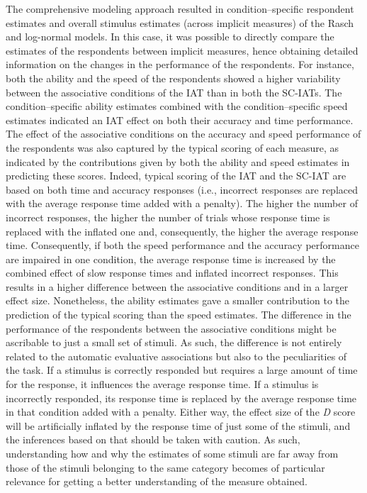 \documentclass[12pt]{book}
\begin{document}
The comprehensive modeling approach resulted in condition--specific respondent estimates and overall stimulus estimates (across implicit measures) of the Rasch and log-normal models. In this case, it was possible to directly compare the estimates of the respondents between implicit measures, hence obtaining detailed information on the changes in the performance of the respondents. For instance, both the ability and the speed of the respondents showed a higher variability between the associative conditions of the IAT than in both the SC-IATs. 
The condition--specific ability estimates combined with the condition--specific speed estimates indicated an IAT effect on both their accuracy and time performance. The effect of the associative conditions on the accuracy and speed performance of the respondents was also captured by the typical scoring of each measure, as indicated by the contributions given by both the ability and speed estimates in predicting these scores. 
Indeed, typical scoring of the IAT and the SC-IAT are based on both time and accuracy responses (i.e., incorrect responses are replaced with the average response time added with a penalty). 
	The higher the number of incorrect responses, the higher the number of trials whose response time is replaced with the inflated one and, consequently, the higher the average response time. 
	Consequently, if both the speed performance and the accuracy performance are impaired in one condition, the average response time is increased by the combined effect of slow response times and inflated incorrect responses. This results in a higher difference between the associative conditions and in a larger effect size.
	Nonetheless, the ability estimates gave a smaller contribution to  the prediction of the typical scoring than the speed estimates.
The difference in the performance of the respondents between the associative conditions might be ascribable to just a small set of stimuli. As such, the difference is not entirely related to the automatic evaluative associations but also to the peculiarities of the task.
If a stimulus is correctly responded but requires a large amount of time for the response, it influences the average response time.
If a stimulus is incorrectly responded, its response time is replaced by the average response time in that condition added with a penalty. 
Either way, the effect size of the \emph{D} score will be artificially inflated by the response time of just some of the stimuli, and the inferences based on that should be taken with caution. As such, understanding how and why the estimates of some stimuli are far away from those of the stimuli belonging to the same category becomes of particular relevance for getting a better understanding of the measure obtained.
\end{document}
